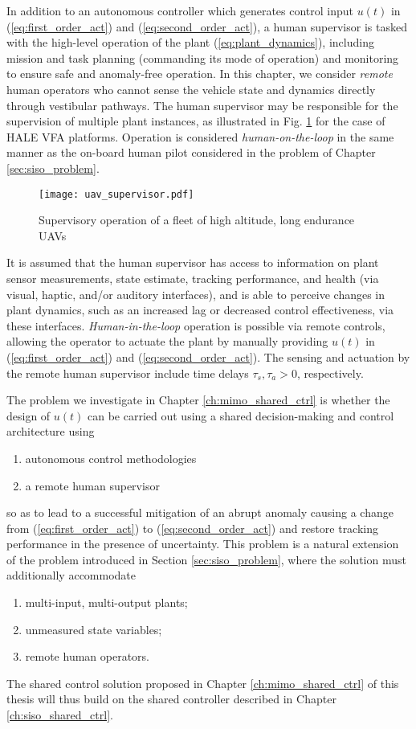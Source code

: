 In addition to an autonomous controller which generates control input $u(t)$ in (\ref{eq:first_order_act}) and (\ref{eq:second_order_act}), a human supervisor is tasked with the high-level operation of the plant (\ref{eq:plant_dynamics}), including mission and task planning (commanding its mode of operation) and monitoring to ensure safe and anomaly-free operation. In this chapter, we consider \textit{remote} human operators who cannot sense the vehicle state and dynamics directly through vestibular pathways. The human supervisor may be responsible for the supervision of multiple plant instances, as illustrated in Fig. \ref{fig:uav_supervisor} for the case of HALE VFA platforms. Operation is considered \textit{human-on-the-loop} in the same manner as the on-board human pilot considered in the problem of Chapter \ref{sec:siso_problem}. 

\begin{figure}[htbp]
	\centering
	\texttt{[image: uav\_supervisor.pdf]}
	\caption{Supervisory operation of a fleet of high altitude, long endurance UAVs}
	\label{fig:uav_supervisor}
\end{figure}

It is assumed that the human supervisor has access to information on plant sensor measurements, state estimate, tracking performance, and health (via visual, haptic, and/or auditory interfaces), and is able to perceive changes in plant dynamics, such as an increased lag or decreased control effectiveness, via these interfaces.  \textit{Human-in-the-loop} operation is possible via remote controls, allowing the operator to actuate the plant by manually providing $u(t)$ in (\ref{eq:first_order_act}) and (\ref{eq:second_order_act}). The sensing and actuation by the remote human supervisor include time delays $\tau_s, \tau_a > 0$, respectively.

The problem we investigate in Chapter \ref{ch:mimo_shared_ctrl} is whether the design of $u(t)$ can be carried out using a shared decision-making and control architecture using
\begin{enumerate}[label=(\alph*)]
	\item autonomous control methodologies
	\item a remote human supervisor
\end{enumerate}
so as to lead to a successful mitigation of an abrupt anomaly causing a change from (\ref{eq:first_order_act}) to (\ref{eq:second_order_act}) and restore tracking performance in the presence of uncertainty. This problem is a natural extension of the problem introduced in Section \ref{sec:siso_problem}, where the solution must additionally accommodate
\begin{enumerate}[label=(\roman*)]
	\item multi-input, multi-output plants;
	\item unmeasured state variables;
	\item remote human operators.
\end{enumerate}
The shared control solution proposed in Chapter \ref{ch:mimo_shared_ctrl} of this thesis will thus build on the shared controller described in Chapter \ref{ch:siso_shared_ctrl}.
  
